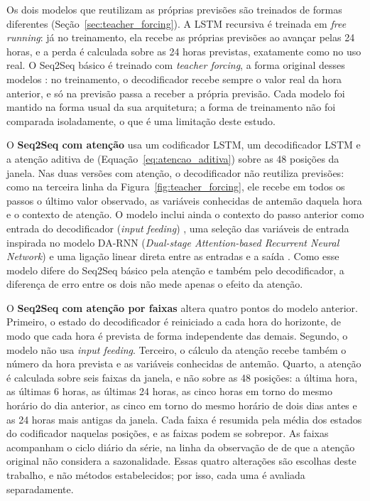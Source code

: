Os dois modelos que reutilizam as próprias previsões são treinados de formas diferentes (Seção~\ref{sec:teacher_forcing}). A LSTM recursiva é treinada em \textit{free running}: já no treinamento, ela recebe as próprias previsões ao avançar pelas 24 horas, e a perda é calculada sobre as 24 horas previstas, exatamente como no uso real. O Seq2Seq básico é treinado com \textit{teacher forcing}, a forma original desses modelos \cite{sutskever2014sequence}: no treinamento, o decodificador recebe sempre o valor real da hora anterior, e só na previsão passa a receber a própria previsão. Cada modelo foi mantido na forma usual da sua arquitetura; a forma de treinamento não foi comparada isoladamente, o que é uma limitação deste estudo.

O \textbf{Seq2Seq com atenção} usa um codificador LSTM, um decodificador LSTM e a atenção aditiva de  (Equação~\ref{eq:atencao_aditiva}) sobre as 48 posições da janela. Nas duas versões com atenção, o decodificador não reutiliza previsões: como na terceira linha da Figura~\ref{fig:teacher_forcing}, ele recebe em todos os passos o último valor observado, as variáveis conhecidas de antemão daquela hora e o contexto de atenção. O modelo inclui ainda o contexto do passo anterior como entrada do decodificador (\textit{input feeding}) \cite{luong2015effective}, uma seleção das variáveis de entrada inspirada no modelo DA-RNN (\textit{Dual-stage Attention-based Recurrent Neural Network}) \cite{qin2017darnn} e uma ligação linear direta entre as entradas e a saída \cite{cheng2016wide}. Como esse modelo difere do Seq2Seq básico pela atenção e também pelo decodificador, a diferença de erro entre os dois não mede apenas o efeito da atenção.

O \textbf{Seq2Seq com atenção por faixas} altera quatro pontos do modelo anterior. Primeiro, o estado do decodificador é reiniciado a cada hora do horizonte, de modo que cada hora é prevista de forma independente das demais. Segundo, o modelo não usa \textit{input feeding}. Terceiro, o cálculo da atenção recebe também o número da hora prevista e as variáveis conhecidas de antemão. Quarto, a atenção é calculada sobre seis faixas da janela, e não sobre as 48 posições: a última hora, as últimas 6 horas, as últimas 24 horas, as cinco horas em torno do mesmo horário do dia anterior, as cinco em torno do mesmo horário de dois dias antes e as 24 horas mais antigas da janela. Cada faixa é resumida pela média dos estados do codificador naquelas posições, e as faixas podem se sobrepor. As faixas acompanham o ciclo diário da série, na linha da observação de  de que a atenção original não considera a sazonalidade. Essas quatro alterações são escolhas deste trabalho, e não métodos estabelecidos; por isso, cada uma é avaliada separadamente.

